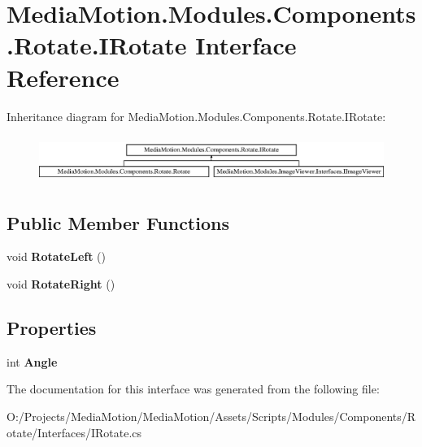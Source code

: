 \hypertarget{interface_media_motion_1_1_modules_1_1_components_1_1_rotate_1_1_i_rotate}{\section{Media\+Motion.\+Modules.\+Components.\+Rotate.\+I\+Rotate Interface Reference}
\label{interface_media_motion_1_1_modules_1_1_components_1_1_rotate_1_1_i_rotate}
}
Inheritance diagram for Media\+Motion.\+Modules.\+Components.\+Rotate.\+I\+Rotate\+:\begin{figure}[H]
\begin{center}
\leavevmode
\includegraphics[height=1.546961cm]{interface_media_motion_1_1_modules_1_1_components_1_1_rotate_1_1_i_rotate}
\end{center}
\end{figure}
\subsection*{Public Member Functions}
\begin{DoxyCompactItemize}
\item 
\hypertarget{interface_media_motion_1_1_modules_1_1_components_1_1_rotate_1_1_i_rotate_a5cf1c05091e9f5061547a9017fb0385c}{void {\bfseries Rotate\+Left} ()}\label{interface_media_motion_1_1_modules_1_1_components_1_1_rotate_1_1_i_rotate_a5cf1c05091e9f5061547a9017fb0385c}

\item 
\hypertarget{interface_media_motion_1_1_modules_1_1_components_1_1_rotate_1_1_i_rotate_ac56fa99186a829f8da0d3b054e14e92a}{void {\bfseries Rotate\+Right} ()}\label{interface_media_motion_1_1_modules_1_1_components_1_1_rotate_1_1_i_rotate_ac56fa99186a829f8da0d3b054e14e92a}

\end{DoxyCompactItemize}
\subsection*{Properties}
\begin{DoxyCompactItemize}
\item 
\hypertarget{interface_media_motion_1_1_modules_1_1_components_1_1_rotate_1_1_i_rotate_ae526023d04ef483aa7b11717e50de0b4}{int {\bfseries Angle}}\label{interface_media_motion_1_1_modules_1_1_components_1_1_rotate_1_1_i_rotate_ae526023d04ef483aa7b11717e50de0b4}

\end{DoxyCompactItemize}


The documentation for this interface was generated from the following file\+:\begin{DoxyCompactItemize}
\item 
O\+:/\+Projects/\+Media\+Motion/\+Media\+Motion/\+Assets/\+Scripts/\+Modules/\+Components/\+Rotate/\+Interfaces/I\+Rotate.\+cs\end{DoxyCompactItemize}
